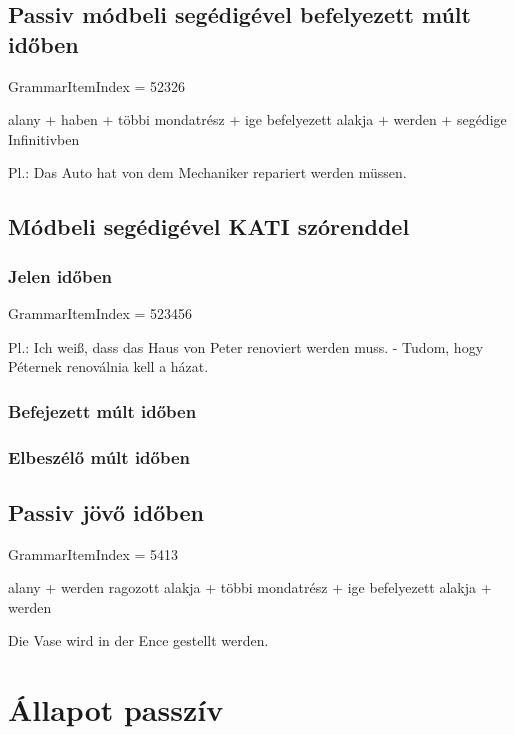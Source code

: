 \documentclass{article}
\newenvironment{desc}{\verbatim}{\endverbatim}
\begin{document}
\subsection{Passiv módbeli segédigével befelyezett múlt időben}

GrammarItemIndex = 52326

\begin{desc}
alany + haben + többi mondatrész + ige befelyezett alakja + werden + segédige Infinitivben

Pl.: Das Auto hat von dem Mechaniker repariert werden müssen.
\end{desc}

\subsection{Módbeli segédigével KATI szórenddel}

\subsubsection{Jelen időben}

GrammarItemIndex = 523456

\begin{desc}
Pl.: Ich weiß, dass das Haus von Peter renoviert werden muss. - Tudom, hogy Péternek renoválnia kell a házat.
\end{desc}

\subsubsection{Befejezett múlt időben}

\subsubsection{Elbeszélő múlt időben}

\subsection{Passiv jövő időben}

GrammarItemIndex = 5413

\begin{desc}
alany + werden ragozott alakja + többi mondatrész + ige befelyezett alakja + werden

Die Vase wird in der Ence gestellt werden.
\end{desc}

\section{Állapot passzív}
\end{document}
